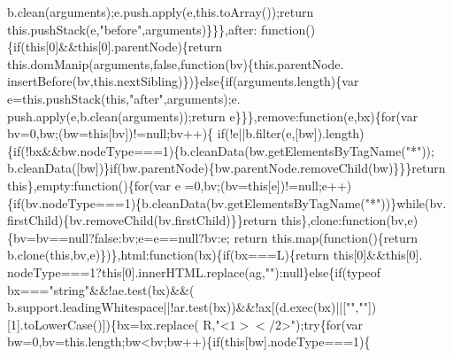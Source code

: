\begin{DoxyCode}
      b.clean(arguments);e.push.apply(e,this.toArray());\textcolor{keywordflow}{return} this.pushStack(e,\textcolor{stringliteral}{"before"},arguments)\}\}\},after:\textcolor{keyword}{
      function}()\{\textcolor{keywordflow}{if}(\textcolor{keyword}{this}[0]&&\textcolor{keyword}{this}[0].parentNode)\{\textcolor{keywordflow}{return} this.domManip(arguments,\textcolor{keyword}{false},\textcolor{keyword}{function}(bv)\{this.parentNode.
      insertBefore(bv,this.nextSibling)\})\}\textcolor{keywordflow}{else}\{\textcolor{keywordflow}{if}(arguments.length)\{var e=this.pushStack(\textcolor{keyword}{this},\textcolor{stringliteral}{"after"},arguments);e.
      push.apply(e,b.clean(arguments));\textcolor{keywordflow}{return} e\}\}\},\textcolor{keyword}{remove}:\textcolor{keyword}{function}(e,bx)\{\textcolor{keywordflow}{for}(var bv=0,bw;(bw=\textcolor{keyword}{this}[bv])!=null;bv++)\{\textcolor{keywordflow}{
      if}(!e||b.filter(e,[bw]).length)\{\textcolor{keywordflow}{if}(!bx&&bw.nodeType===1)\{b.cleanData(bw.getElementsByTagName(\textcolor{stringliteral}{"*"}));
      b.cleanData([bw])\}\textcolor{keywordflow}{if}(bw.parentNode)\{bw.parentNode.removeChild(bw)\}\}\}\textcolor{keywordflow}{return} \textcolor{keyword}{this}\},empty:\textcolor{keyword}{function}()\{\textcolor{keywordflow}{for}(var e
      =0,bv;(bv=\textcolor{keyword}{this}[e])!=null;e++)\{\textcolor{keywordflow}{if}(bv.nodeType===1)\{b.cleanData(bv.getElementsByTagName(\textcolor{stringliteral}{"*"}))\}\textcolor{keywordflow}{while}(bv.
      firstChild)\{bv.removeChild(bv.firstChild)\}\}\textcolor{keywordflow}{return} \textcolor{keyword}{this}\},clone:\textcolor{keyword}{function}(bv,e)\{bv=bv==null?\textcolor{keyword}{false}:bv;e=e==null?bv:e;\textcolor{keywordflow}{
      return} this.map(\textcolor{keyword}{function}()\{\textcolor{keywordflow}{return} b.clone(\textcolor{keyword}{this},bv,e)\})\},html:\textcolor{keyword}{function}(bx)\{\textcolor{keywordflow}{if}(bx===L)\{\textcolor{keywordflow}{return} \textcolor{keyword}{this}[0]&&\textcolor{keyword}{this}[0].
      nodeType===1?\textcolor{keyword}{this}[0].innerHTML.replace(ag,\textcolor{stringliteral}{""}):null\}\textcolor{keywordflow}{else}\{\textcolor{keywordflow}{if}(typeof bx===\textcolor{stringliteral}{"string"}&&!ae.test(bx)&&(
      b.support.leadingWhitespace||!ar.test(bx))&&!ax[(d.exec(bx)||[\textcolor{stringliteral}{""},\textcolor{stringliteral}{""}])[1].toLowerCase()])\{bx=bx.replace(
      R,\textcolor{stringliteral}{"<$1></$2>"});\textcolor{keywordflow}{try}\{\textcolor{keywordflow}{for}(var bw=0,bv=this.length;bw<bv;bw++)\{\textcolor{keywordflow}{if}(\textcolor{keyword}{this}[bw].nodeType===1)\{

\end{DoxyCode}
